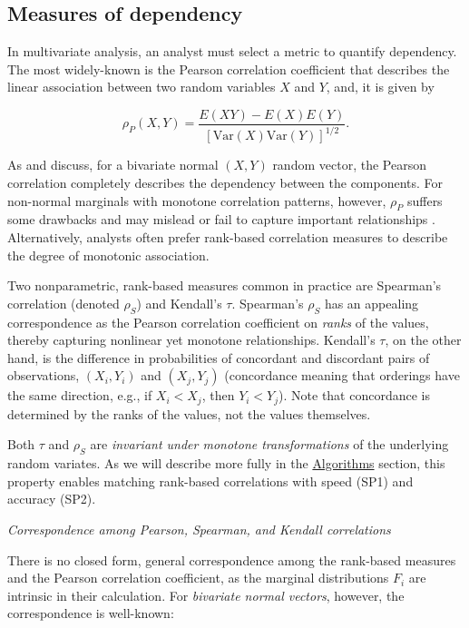\documentclass[
]{jss}
\begin{document}
\hypertarget{measures-of-dependency}{%
\subsection{Measures of dependency}\label{measures-of-dependency}}

In multivariate analysis, an analyst must select a metric to quantify
dependency. The most widely-known is the Pearson correlation coefficient
that describes the linear association between two random variables \(X\)
and \(Y\), and, it is given by

\begin{equation}
\rho_P(X,Y) = \frac{E(XY) - E(X)E(Y)}{\left[ \mathrm{Var}(X)\mathrm{Var}(Y)\right]^{1/2}}.
\label{eq:pearson}
\end{equation}

As \citet{MB13} and \citet{MK01} discuss, for a bivariate normal
\((X,Y)\) random vector, the Pearson correlation completely describes
the dependency between the components. For non-normal marginals with
monotone correlation patterns, however, \(\rho_P\) suffers some
drawbacks and may mislead or fail to capture important relationships
\citep{MK01}. Alternatively, analysts often prefer rank-based
correlation measures to describe the degree of monotonic association.

Two nonparametric, rank-based measures common in practice are Spearman's
correlation (denoted \(\rho_S\)) and Kendall's \(\tau\). Spearman's
\(\rho_S\) has an appealing correspondence as the Pearson correlation
coefficient on \emph{ranks} of the values, thereby capturing nonlinear
yet monotone relationships. Kendall's \(\tau\), on the other hand, is
the difference in probabilities of concordant and discordant pairs of
observations, \((X_i, Y_i)\) and \((X_j, Y_j)\) (concordance meaning
that orderings have the same direction, e.g., if \(X_i < X_j\), then
\(Y_i < Y_j\)). Note that concordance is determined by the ranks of the
values, not the values themselves.

Both \(\tau\) and \(\rho_S\) are \emph{invariant under monotone
transformations} of the underlying random variates. As we will describe
more fully in the \protect\hyperlink{algorithms}{Algorithms} section,
this property enables matching rank-based correlations with speed (SP1)
and accuracy (SP2).

\emph{Correspondence among Pearson, Spearman, and Kendall correlations}

There is no closed form, general correspondence among the rank-based
measures and the Pearson correlation coefficient, as the marginal
distributions \(F_i\) are intrinsic in their calculation. For
\emph{bivariate normal vectors}, however, the correspondence is
well-known:
\end{document}
